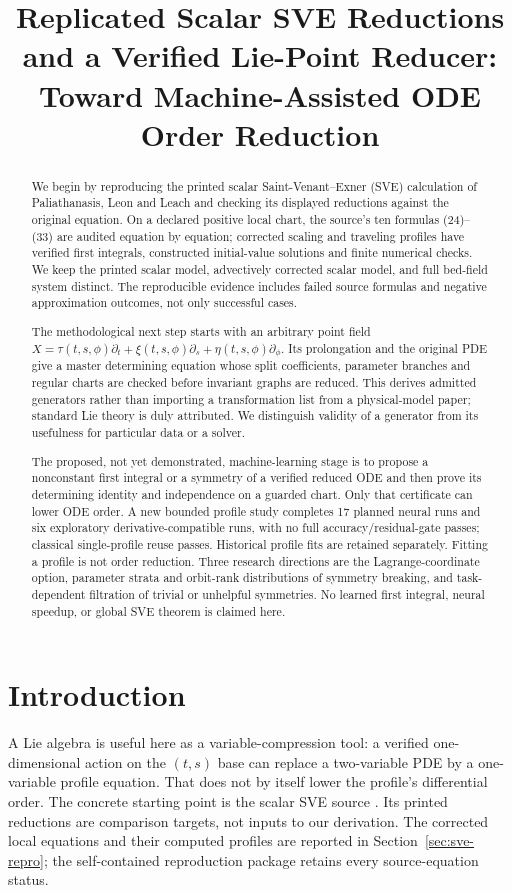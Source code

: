 \documentclass[11pt]{article}
\title{Replicated Scalar SVE Reductions and a Verified Lie-Point Reducer:\\
Toward Machine-Assisted ODE Order Reduction}
\author{}
\date{}
\theoremstyle{definition}
\begin{document}
\maketitle
\begin{abstract}
We begin by reproducing the printed scalar Saint-Venant--Exner (SVE)
calculation of Paliathanasis, Leon and Leach and checking its displayed
reductions against the original equation. On a declared positive local chart,
the source's ten formulas (24)--(33) are audited equation by equation; corrected
scaling and traveling profiles have verified first integrals, constructed
initial-value solutions and finite numerical checks. We keep the printed
scalar model, advectively corrected scalar model, and full bed-field system
distinct. The reproducible evidence includes failed source formulas
and negative approximation outcomes, not only successful cases.

The methodological next step starts with an arbitrary point field
$X=\tau(t,s,\phi)\partial_t+\xi(t,s,\phi)\partial_s+
\eta(t,s,\phi)\partial_\phi$. Its prolongation and the original PDE give a
master determining equation whose split coefficients, parameter branches and
regular charts are checked before invariant graphs are reduced. This derives
admitted generators rather than importing a transformation list from a
physical-model paper; standard Lie theory is duly attributed. We distinguish
validity of a generator from its usefulness for particular data or a solver.

The proposed, not yet demonstrated, machine-learning stage is to propose a
nonconstant first integral or a symmetry of a verified reduced ODE and then
prove its determining identity and independence on a guarded chart. Only that
certificate can lower ODE order. A new bounded profile study completes 17 planned neural runs and six
exploratory derivative-compatible runs, with no full accuracy/residual-gate
passes; classical single-profile reuse passes. Historical profile fits are
retained separately. Fitting a profile is not order reduction. Three
research directions are the Lagrange-coordinate option, parameter strata and
orbit-rank distributions of symmetry breaking, and task-dependent filtration
of trivial or unhelpful symmetries. No learned first integral, neural speedup,
or global SVE theorem is claimed here.
\end{abstract}

\section{Introduction}
A Lie algebra is useful here as a variable-compression tool: a verified
one-dimensional action on the $(t,s)$ base can replace a two-variable PDE
by a one-variable profile equation. That does not by itself lower the
profile's differential order. The concrete starting point is the scalar SVE
source \cite{ap}. Its printed reductions are comparison targets, not inputs
to our derivation. The corrected local equations and their computed profiles
are reported in Section~\ref{sec:sve-repro}; the self-contained reproduction
package retains every source-equation status.
\end{document}
